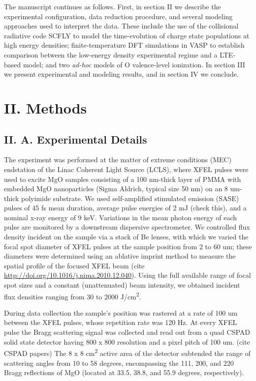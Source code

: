The manuscript continues as follows. First, in section II we describe
the experimental configuration, data reduction procedure, and several
modeling approaches used to interpret the data. These include the use of
the collisional radiative code SCFLY to model the time-evolution of
charge state populations at high energy densities; finite-temperature
DFT simulations in VASP to establish comparison between the low-energy
density experimental regime and a LTE-based model; and two \emph{ad-hoc}
models of O valence-level ionization. In section III we present
experimental and modeling results, and in section IV we conclude.

\section{II. Methods}

\subsection{II. A. Experimental Details}

The experiment was performed at the matter of extreme conditions (MEC)
endstation of the Linac Coherent Light Source (LCLS), where XFEL pulses
were used to excite MgO samples consisting of a 100 nm-thick layer of
PMMA with embedded MgO nanoparticles (Sigma Aldrich, typical size 50 nm)
on an 8 um-thick polyimide substrate. We used self-amplified stimulated
emission (SASE) pulses of 45 fs mean duration, average pulse energies of
2 mJ (check this), and a nominal x-ray energy of 9 keV. Variations in
the mean photon energy of each pulse are monitored by a downstream
dispersive spectrometer. We controlled flux density incident on the
sample via a stack of Be lenses, with which we varied the focal spot
diameter of XFEL pulses at the sample position from 2 to 60 um; these
diameters were determined using an ablative imprint method to measure
the spatial profile of the focused XFEL beam (cite
\url{http://doi.org/10.1016/j.nima.2010.12.040}). Using the full
available range of focal spot sizes and a constant (unattenuated) beam
intensity, we obtained incident flux densities ranging from 30 to 2000
J/cm\textsuperscript{2}.

During data collection the sample's position was rastered at a rate of
100 um between the XFEL pulses, whose repetition
rate was 120 Hz. At every XFEL pulse the Bragg scattering signal was
collected and read out from a quad CSPAD solid state detector having 800
x 800 resolution and a pixel pitch of 100 um. (cite CSPAD papers) The 8
x 8 cm\textsuperscript{2} active area of the detector subtended the
range of scattering angles from 10 to 58 degrees, encompassing the 111,
200, and 220 Bragg reflections of MgO (located at 33.5, 38.8, and 55.9
degrees, respectively).

